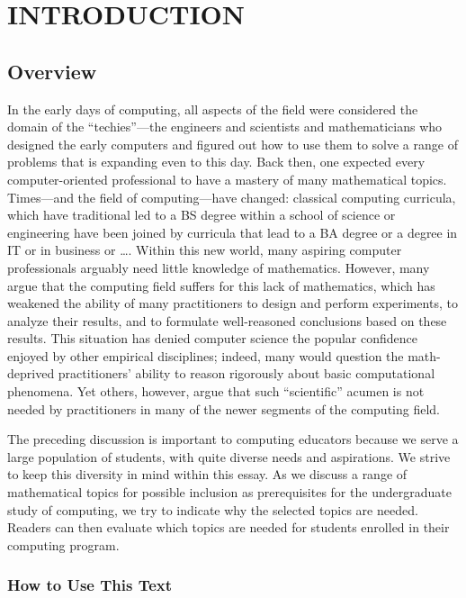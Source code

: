 
\chapter{INTRODUCTION}
\label{ch:intro}

\section{Overview}
\label{sec:overview}

In the early days of computing, all aspects of the field were
considered the domain of the ``techies''---the engineers and
scientists and mathematicians who designed the early computers and
figured out how to use them to solve a range of problems that is
expanding even to this day.  Back then, one expected every
computer-oriented professional to have a mastery of many mathematical
topics.  Times---and the field of computing---have changed: classical
computing curricula, which have traditional led to a BS degree within
a school of science or engineering have been joined by curricula that
lead to a BA degree or a degree in IT or in business or \ldots.
Within this new world, many aspiring computer professionals arguably
need little knowledge of mathematics.  However, many argue that the
computing field suffers for this lack of mathematics, which has
weakened the ability of many practitioners to design and perform
experiments, to analyze their results, and to formulate well-reasoned
conclusions based on these results.  This situation has denied
computer science the popular confidence enjoyed by other empirical
disciplines; indeed, many would question the math-deprived
practitioners' ability to reason rigorously about basic computational
phenomena.  Yet others, however, argue that such ``scientific'' acumen
is not needed by practitioners in many of the newer segments of the
computing field.

The preceding discussion is important to computing educators because
we serve a large population of students, with quite diverse needs and
aspirations.  We strive to keep this diversity in mind within this
essay.  As we discuss a range of mathematical topics for possible
inclusion as prerequisites for the undergraduate study of computing,
we try to indicate why the selected topics are needed.  Readers can
then evaluate which topics are needed for students enrolled in their
computing program.

\subsection{How to Use This Text}
\label{sec:how-to-use}


